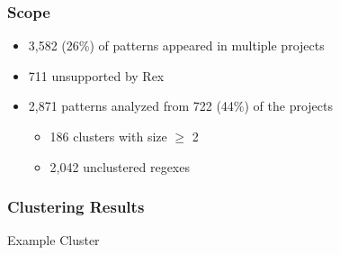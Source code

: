 
\begin{frame}
\frametitle{Scope}

\begin{itemize}
\item 3,582 (26\%) of patterns appeared in multiple projects 
\item 711 unsupported by Rex
\vspace{12pt}
\item<2-> 2,871 patterns analyzed from 722 (44\%) of the projects
\begin{itemize}
\item<2->186 clusters with size $\geq$ 2
\item<2-> 2,042 unclustered regexes
\end{itemize}
\end{itemize}

\end{frame}

\begin{frame}[fragile]
\frametitle{Clustering Results}

\begin{center}
Example Cluster
\end{center}

\end{frame}





